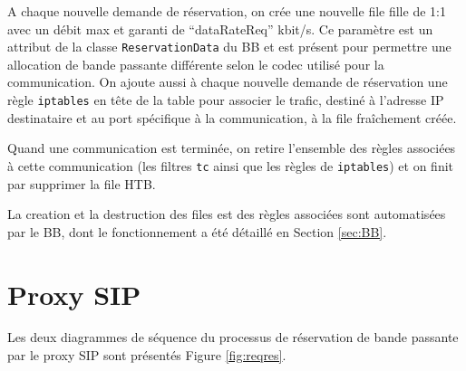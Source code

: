 \documentclass[a4paper,11pt]{article}
\let\Oldsection\section
\renewcommand{\section}{\FloatBarrier\Oldsection}
\begin{document}
A chaque nouvelle demande de réservation, on crée une nouvelle file fille de 1:1 avec un débit max et garanti de “dataRateReq” kbit/s. Ce paramètre est un attribut de la classe \texttt{ReservationData} du BB et est présent pour permettre une allocation de bande passante différente selon le codec utilisé pour la communication. On ajoute aussi à chaque nouvelle demande de réservation une règle \texttt{iptables} en tête de la table pour associer le trafic, destiné à l’adresse IP destinataire et au port spécifique à la communication, à la file fraîchement créée. 

Quand une communication est terminée, on retire l’ensemble des règles associées à cette communication (les filtres \texttt{tc} ainsi que les règles de \texttt{iptables}) et on finit par supprimer la file HTB.

La creation et la destruction des files est des règles associées sont automatisées par le BB, dont le fonctionnement a été détaillé en Section \ref{sec:BB}.

\section{Proxy SIP}

Les deux diagrammes de séquence du processus de réservation de bande passante par le proxy SIP sont présentés Figure \ref{fig:reqres}.
\end{document}
